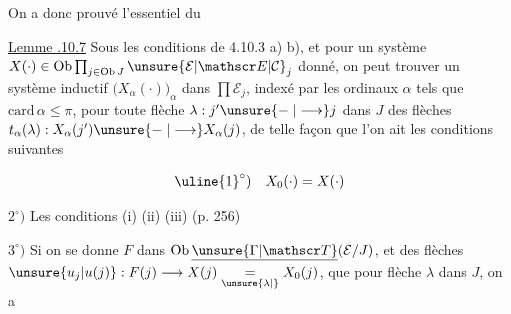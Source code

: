 On a donc prouvé l'essentiel du

\uline{Lemme .10.7} Sous les conditions de 4.10.3 a) b), et pour un système $X(\cdot)\in\operatorname{Ob}\prod_{j\in\operatorname{Ob}J}\unsure{\mathcal E|\mathscr E|\mathcal C}_j$ donné, on peut trouver un système inductif $\bigl(X_\alpha(\cdot)\bigr)_\alpha$ dans $\prod\mathcal E_j$, indexé par les ordinaux $\alpha$ tels que $\mathrm{card}\,\alpha\leq\pi$,  pour toute flèche $\lambda:j'\unsure{\mathrel{-}|\longrightarrow}j$ dans $J$  des flèches $t_\alpha(\lambda):X_\alpha(j')\unsure{\mathrel{-}|\longrightarrow}X_\alpha(j)$, de telle façon que l'on ait les conditions suivantes

\[
 \uline{1}^{\circ})\quad X_0(\cdot)=X(\cdot)
\]

$2^\circ)$ Les conditions (i) (ii) (iii) (p. 256)

$3^\circ)$ Si on se donne $F$ dans $\operatorname{Ob}\underline{\unsure{\Gamma|\mathscr T}}(\mathcal E/J)$, et des flèches $\unsure{u_j|u(j)}:F(j)\longrightarrow X(j)\underset{\unsure{\lambda|{}}}{=}X_0(j)$,  que pour  flèche $\lambda$ dans $J$, on a
